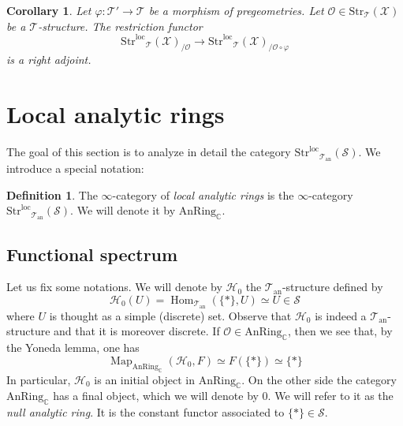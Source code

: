 \documentclass[12pt,a4paper,reqno]{amsart}
\theoremstyle{plain}
\newtheorem{cor}[thm]{Corollary}
\theoremstyle{definition}
\newtheorem{defin}[thm]{Definition}
\theoremstyle{remark}
\numberwithin{equation}{section}
\begin{document}
\begin{cor} \label{cor:Phi_right_adjoint}
	Let $\varphi \colon {\mathcal T}' \to {\mathcal T}$ be a morphism of pregeometries.
	Let ${\mathcal O} \in {\mathrm{Str}}_{\mathcal T}({\mathcal X})$ be a ${\mathcal T}$-structure.
	The restriction functor
	\[ {\mathrm{Str}^\mathrm{loc}}_{\mathcal T}({\mathcal X})_{/{\mathcal O}} \to {\mathrm{Str}^\mathrm{loc}}_{\mathcal T}({\mathcal X})_{/{\mathcal O} \circ \varphi} \]
	is a right adjoint.
\end{cor}

\section{Local analytic rings} \label{sec:local_analytic_rings}

The goal of this section is to analyze in detail the category ${\mathrm{Str}^\mathrm{loc}}_{{\mathcal T}_{\mathrm{an}}}({\mathcal S})$. We introduce a special notation:

\begin{defin}
	The $\infty$-category of \emph{local analytic rings} is the $\infty$-category ${\mathrm{Str}^\mathrm{loc}}_{{\mathcal T}_{\mathrm{an}}}({\mathcal S})$.
	We will denote it by $\mathrm{AnRing}_{\mathbb C}$.
\end{defin}

\subsection{Functional spectrum} \label{subsec:functional_spectrum}

Let us fix some notations. We will denote by ${\mathcal H}_0$ the ${{\mathcal T}_{\mathrm{an}}}$-structure defined by
\[ {\mathcal H}_0(U) = \operatorname{Hom}_{{\mathcal T}_{\mathrm{an}}}(\{*\}, U) \simeq U \in {\mathcal S} \]
where $U$ is thought as a simple (discrete) set.
Observe that ${\mathcal H}_0$ is indeed a ${{\mathcal T}_{\mathrm{an}}}$-structure and that it is moreover discrete.
If ${\mathcal O} \in {\mathrm{AnRing}_{\mathbb C}}$, then we see that, by the Yoneda lemma, one has
\[ \operatorname{Map}_{\mathrm{AnRing}_{\mathbb C}}({\mathcal H}_0, F) \simeq F(\{*\}) \simeq \{*\} \]
In particular, ${\mathcal H}_0$ is an initial object in ${\mathrm{AnRing}_{\mathbb C}}$.
On the other side the category ${\mathrm{AnRing}_{\mathbb C}}$ has a final object, which we will denote by $0$.
We will refer to it as the \emph{null analytic ring}.
It is the constant functor associated to $\{*\} \in {\mathcal S}$.
\end{document}
